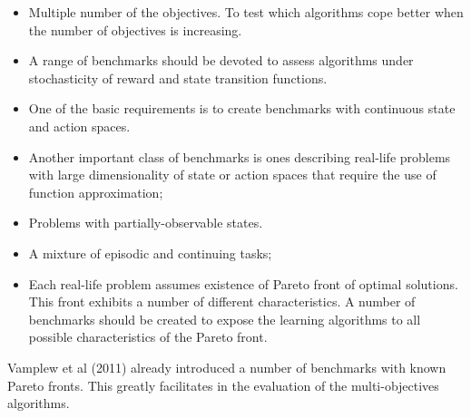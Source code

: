 {{\begin{itemize}

\item Multiple number of the objectives. To test which algorithms cope better when the number of objectives is increasing.

\item A range of benchmarks should be devoted to assess algorithms under stochasticity of reward and state transition functions.

\item One of the basic requirements is to create benchmarks with continuous state and action spaces.

\item Another important class of benchmarks is ones describing real-life problems with large dimensionality of state or action spaces that require the use of function approximation;

\item Problems with partially-observable states.

\item A mixture of episodic and continuing tasks;

\item Each real-life problem assumes existence of Pareto front of optimal solutions. This front exhibits a number of different characteristics. A number of benchmarks should be created to expose the learning algorithms to all possible characteristics of the Pareto front.

\end{itemize}

Vamplew et al (2011)\nocite{vamplew2011empirical} already introduced a number of benchmarks with known Pareto fronts. This greatly facilitates in the evaluation of the multi-objectives algorithms.

}}

